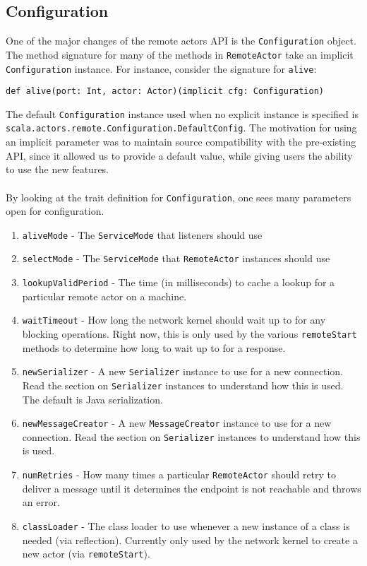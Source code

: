 \documentclass{article}
\begin{document}
\subsection{Configuration}
One of the major changes of the remote actors API is the \verb|Configuration| object.
The method signature for many of the methods in \verb|RemoteActor| take an
implicit \verb|Configuration| instance. For instance, consider the signature
for \verb|alive|:
\begin{verbatim}
def alive(port: Int, actor: Actor)(implicit cfg: Configuration)
\end{verbatim}
The default \verb|Configuration| instance used when no explicit instance is specified
is \\ \verb|scala.actors.remote.Configuration.DefaultConfig|. The motivation for using
an implicit parameter was to maintain source compatibility with the pre-existing API, since
it allowed us to provide a default value, while giving users the ability to use the new features.\\ \\
By looking at the trait
definition for \verb|Configuration|, one sees many parameters open for configuration.
\begin{enumerate}
  \item \verb|aliveMode| - The \verb|ServiceMode| that listeners should use
  \item \verb|selectMode| - The \verb|ServiceMode| that \verb|RemoteActor| instances should use
  \item \verb|lookupValidPeriod| - The time (in milliseconds) to cache a lookup for a particular 
    remote actor on a machine.
  \item \verb|waitTimeout| - How long the network kernel should wait up to for any blocking operations.
    Right now, this is only used by the various \verb|remoteStart| methods to determine how long
    to wait up to for a response.
  \item \verb|newSerializer| - A new \verb|Serializer| instance to use for a new connection. 
    Read the section on \verb|Serializer| instances to understand how this is used. The
    default is Java serialization.
  \item \verb|newMessageCreator| - A new \verb|MessageCreator| instance to use for a new connection.
    Read the section on \verb|Serializer| instances to understand how this is used.
  \item \verb|numRetries| - How many times a particular \verb|RemoteActor| should retry to deliver a message
    until it determines the endpoint is not reachable and throws an error.
  \item \verb|classLoader| - The class loader to use whenever a new instance of a class is needed (via reflection). 
    Currently only used by the network kernel to create a new actor (via \verb|remoteStart|).
\end{enumerate}
\end{document}
